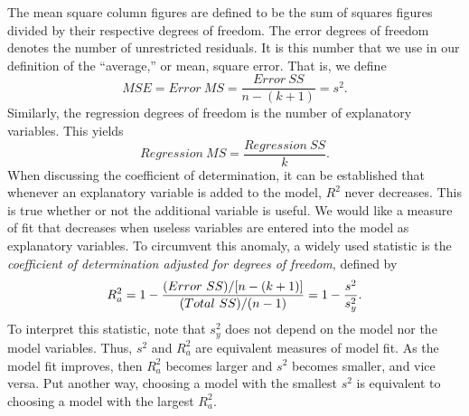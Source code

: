 
\noindent The mean square column figures are defined to be the sum
of squares figures divided by their respective degrees of freedom.
The error degrees of freedom denotes the number of unrestricted
residuals. It is this number that we use in our definition of the
``average,'' or mean, square error. That is, we define
\begin{equation*}
MSE=Error~MS=\frac{Error~SS}{n-(k+1)}=s^2.
\end{equation*}
Similarly, the regression degrees of freedom is the number of
explanatory variables. This yields
\begin{equation*}
Regression~MS=\frac{Regression~SS}{k}.
\end{equation*}
When discussing the coefficient of determination, it can be
established that whenever an explanatory variable is added to the
model, $R^2$ never decreases. This is true whether or not the
additional variable is useful. We would like a measure of fit that
decreases when useless variables are entered into the model as
explanatory variables. To circumvent this anomaly, a widely used
statistic is the \emph{coefficient of determination adjusted for
degrees of freedom}, defined by
\begin{equation}\label{E3:AdjustedR2}
R_{a}^2=1-\frac{(Error~SS)/[n-(k+1)]}{(Total~SS)/(n-1)}=1-\frac{s^2}{%
s_{y}^2}.
\end{equation}
To interpret this statistic, note that $s_y^2$ does not depend on
the model nor the model variables. Thus, $s^2$ and $R_a^2$ are
equivalent measures of model fit. As the model fit improves, then
$R_{a}^2$ becomes larger and $s^2$ becomes smaller, and vice versa.
Put another way, choosing a model with the smallest $s^2$ is
equivalent to choosing a model with the largest $R_a^2$.


\linejed

